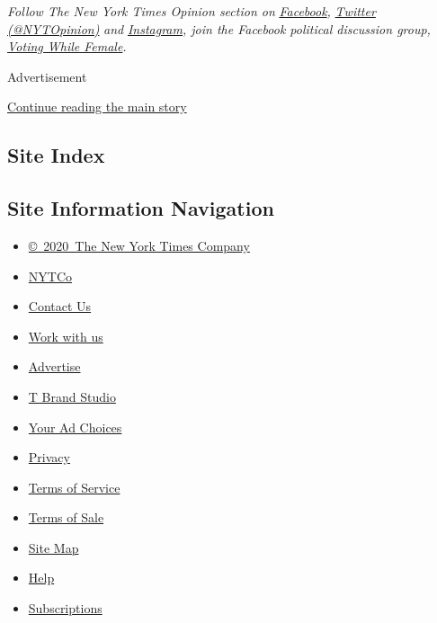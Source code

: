 \emph{Follow The New York Times Opinion section on}
\href{https://www.facebook.com/nytopinion}{\emph{Facebook}}\emph{,}
\href{http://twitter.com/NYTOpinion}{\emph{Twitter (@NYTOpinion)}}
\emph{and}
\href{https://www.instagram.com/nytopinion/}{\emph{Instagram}}\emph{,
join the Facebook political discussion group,}
\href{https://www.facebook.com/groups/votingwhilefemale/}{\emph{Voting
While Female}}\emph{.}

Advertisement

\protect\hyperlink{after-bottom}{Continue reading the main story}

\hypertarget{site-index}{%
\subsection{Site Index}\label{site-index}}

\hypertarget{site-information-navigation}{%
\subsection{Site Information
Navigation}\label{site-information-navigation}}

\begin{itemize}
\tightlist
\item
  \href{https://help.nytimes.com/hc/en-us/articles/115014792127-Copyright-notice}{©~2020~The
  New York Times Company}
\end{itemize}

\begin{itemize}
\tightlist
\item
  \href{https://www.nytco.com/}{NYTCo}
\item
  \href{https://help.nytimes.com/hc/en-us/articles/115015385887-Contact-Us}{Contact
  Us}
\item
  \href{https://www.nytco.com/careers/}{Work with us}
\item
  \href{https://nytmediakit.com/}{Advertise}
\item
  \href{http://www.tbrandstudio.com/}{T Brand Studio}
\item
  \href{https://www.nytimes.com/privacy/cookie-policy\#how-do-i-manage-trackers}{Your
  Ad Choices}
\item
  \href{https://www.nytimes.com/privacy}{Privacy}
\item
  \href{https://help.nytimes.com/hc/en-us/articles/115014893428-Terms-of-service}{Terms
  of Service}
\item
  \href{https://help.nytimes.com/hc/en-us/articles/115014893968-Terms-of-sale}{Terms
  of Sale}
\item
  \href{https://spiderbites.nytimes.com}{Site Map}
\item
  \href{https://help.nytimes.com/hc/en-us}{Help}
\item
  \href{https://www.nytimes.com/subscription?campaignId=37WXW}{Subscriptions}
\end{itemize}
